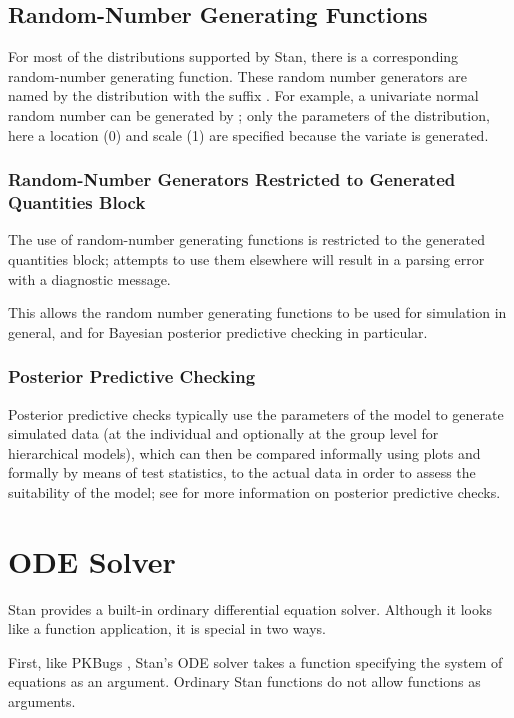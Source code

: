\subsection{Random-Number Generating Functions}

For most of the distributions supported by Stan, there is a
corresponding random-number generating function.  These random number
generators are named by the distribution with the suffix .
For example, a univariate normal random number can be generated by
;  only the parameters of the distribution,
here a location (0) and scale (1) are specified because the variate is
generated.

\subsubsection{Random-Number Generators Restricted to Generated Quantities Block}

The use of random-number generating functions is restricted to the
generated quantities block; attempts to use them elsewhere will result
in a parsing error with a diagnostic message.

This allows the random number generating functions to be used for
simulation in general, and for Bayesian posterior predictive checking
in particular.

\subsubsection{Posterior Predictive Checking}

Posterior predictive checks typically use the parameters of the model
to generate simulated data (at the individual and optionally at the
group level for hierarchical models), which can then be compared
informally using plots and formally by means of test statistics, to
the actual data in order to assess the suitability of the model; see
\citep[Chapter~6]{GelmanEtAl:2013} for more information on
posterior predictive checks.

\section{ODE Solver}\label{language-ode-solver.section}

Stan provides a built-in ordinary differential equation solver.
Although it looks like a function application, it is special in two
ways.

First, like PKBugs \citep{LunnEtAl:1999}, Stan's ODE solver takes a
function specifying the system of equations as an argument.  Ordinary
Stan functions do not allow functions as arguments.

